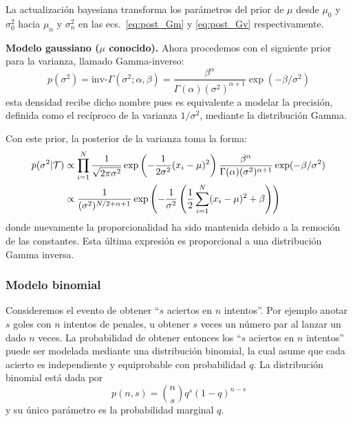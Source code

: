 \begin{remark}
	La actualización bayesiana transforma los parámetros del prior de  $\mu$ desde  $\mu_0$ y $\sigma_0^2$ hacia $\mu_n$ y $\sigma_n^2$ en las ecs.~\eqref{eq:post_Gm} y \eqref{eq:post_Gv} respectivamente. 
\end{remark}

\textbf{Modelo gaussiano ($\mu$ conocido).} Ahora procedemos con el siguiente prior para la varianza, llamado Gamma-inverso:
 \begin{equation}
 	p(\sigma^2)= \text{inv-}\Gamma(\sigma^2;\alpha,\beta) = \frac{\beta^\alpha}{\Gamma(\alpha) (\sigma^2)^{\alpha+1}}\exp(-\beta/\sigma^2)
 \end{equation}
 esta densidad recibe dicho nombre pues es equivalente a modelar la precisión, definida como el recíproco de la varianza $1/\sigma^2$, mediante la distribución Gamma.  

 Con este prior, la posterior de la varianza toma la forma:
 \begin{align}
 	p(\sigma^2|{\mathcal T}) &\propto \prod_{i=1}^N \frac{1}{\sqrt{2\pi\sigma^2}}\exp\left(-\frac{1}{2\sigma^2}(x_i-\mu)^2\right) \frac{\beta^\alpha}{\Gamma(\alpha) (\sigma^2)^{\alpha+1}}\exp(-\beta/\sigma^2)\\
 	&\propto  \frac{1}{(\sigma^2)^{N/2+\alpha+1}}\exp\left(-\frac{1}{\sigma^2}\left(\frac{1}{2}\sum_{i=1}^N(x_i-\mu)^2 +\beta\right) \right)\nonumber
 \end{align} 
 donde nuevamente la proporcionalidad ha sido mantenida debido a la remoción de las constantes. Esta última expresión es proporcional a una distribución Gamma inversa. 







\subsubsection{Modelo binomial}

Consideremos el evento de obtener ``$s$ aciertos en $n$ intentos''. Por ejemplo anotar $s$ goles con $n$ intentos de penales, u obtener $s$ veces un número par al lanzar un dado $n$ veces. La probabilidad de obtener entonces los ``$s$ aciertos en $n$ intentos'' puede ser modelada mediante una distribución binomial, la cual asume que cada acierto es independiente y  equiprobable con probabilidad $q$. La distribución binomial está dada por
\begin{equation}
	p(n, s) = \binom{n}{s} q^s (1-q)^{n-s}
\end{equation}
y su único parámetro es la probabilidad marginal $q$.

